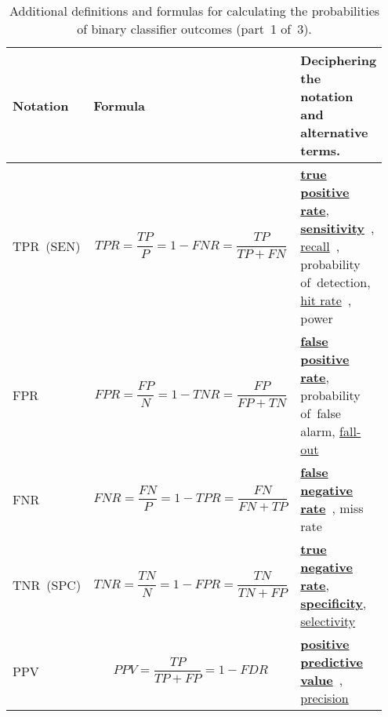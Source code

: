 \documentclass[]{scrreprt}
\begin{document}
\begin{table}[ht]
	\caption{Additional definitions and formulas for calculating the probabilities of binary classifier outcomes (part~1 of~3).}\label{tab:ROC-rates-1}
	\tiny
	\begin{tabularx}{\textwidth}{p{0.15\linewidth} p{0.4\linewidth} p{0.4\linewidth}} 
		\hline
		Notation&Formula&Deciphering the notation and alternative terms.\\
		\hline
		TPR~(SEN)&\begin{equation}\label{TPR}
		TPR=\frac{TP}{P}=1-FNR=\frac{TP}{TP+FN}
		\end{equation}&\href{https://en.wikipedia.org/wiki/Sensitivity_(test)}{\textbf{true positive rate}}, \href{https://en.wikipedia.org/wiki/Sensitivity_(test)}{\textbf{sensitivity}}~\cite{Wiki:sensitivity-and-specificity}, \href{https://en.wikipedia.org/wiki/Precision_and_recall}{recall}~\cite{Wiki:precision-and-recall}, probability of~detection, \href{https://en.wikipedia.org/wiki/Hit_rate}{hit rate}~\cite{Wiki:hit-rate}, power\\
		\hline
		FPR&\begin{equation}\label{eq:FPR}
		FPR = \frac{FP}{N} = 1 - TNR = \frac{FP}{FP+TN}
		\end{equation}&\href{https://en.wikipedia.org/wiki/False_positive_rate}{\textbf{false positive rate}}, probability of~false alarm, \href{https://en.wikipedia.org/wiki/False_positive_rate}{fall-out}~\cite{Wiki:FPR}\\
		\hline
		FNR&\begin{equation}\label{eq:FNR}
		FNR = \frac{FN}{P} = 1 - TPR = \frac{FN}{FN+TP}
		\end{equation}&\href{https://en.wikipedia.org/wiki/Type_I_and_type_II_errors\#False_positive_and_false_negative_rates}{\textbf{false negative rate}}~\cite{Wiki:TypeI-TypeII-errors}, miss rate\\
		\hline
		TNR~(SPC)&\begin{equation}\label{eq:TNR}
		TNR = \frac{TN}{N} = 1 - FPR = \frac{TN}{TN+FP}
		\end{equation}&\href{https://en.wikipedia.org/wiki/Sensitivity_(test)}{\textbf{true negative rate}}, \href{https://en.wikipedia.org/wiki/Sensitivity_(test)}{\textbf{specificity}}, \href{https://en.wikipedia.org/wiki/Sensitivity_(test)}{selectivity}~\cite{Wiki:sensitivity-and-specificity}\\
		\hline
		PPV&\begin{equation}\label{eq:PPV}
		PPV = \frac{TP}{TP+FP} = 1 - FDR
		\end{equation}&\href{https://en.wikipedia.org/wiki/Positive_and_negative_predictive_values}{\textbf{positive predictive value}}~\cite{Wiki:PPV}, \href{https://en.wikipedia.org/wiki/Information_retrieval\#Precision}{precision}~\cite{Wiki:precision}\\

\end{tabularx}
\end{table}
\end{document}
